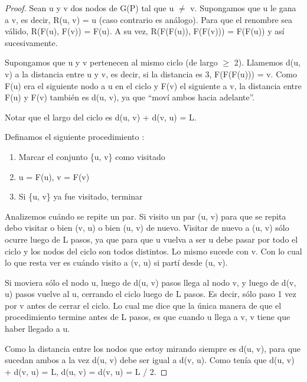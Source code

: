 \begin{proof}
	Sean u y v dos nodos de G(P) tal que u $\neq$ v. Supongamos que u le gana a v, es decir, R(u, v) = u (caso contrario es análogo). Para que el renombre sea válido, R(F(u), F(v)) = F(u). A su vez, R(F(F(u)), F(F(v))) = F(F(u)) y así sucesivamente. \newline

	Supongamos que u y v pertenecen al mismo ciclo (de largo $\geq$ 2). Llamemos d(u, v) a la distancia entre u y v, es decir, si la distancia es 3, F(F(F(u))) = v. Como F(u) era el siguiente nodo a u en el ciclo y F(v) el siguiente a v, la distancia entre F(u) y F(v) también es d(u, v), ya que ``moví ambos hacia adelante''. \newline

	Notar que el largo del ciclo es d(u, v) + d(v, u) = L.

	Definamos el siguiente procedimiento : \newline

	\begin{enumerate}
		\item{Marcar el conjunto \{u, v\} como visitado}
		\item{u = F(u), v = F(v)}
		\item{Si \{u, v\} ya fue visitado, terminar}
	\end{enumerate}

	Analizemos cuándo se repite un par. Si visito un par (u, v) para que se repita debo visitar o bien (v, u) o bien (u, v) de nuevo. Visitar de nuevo a (u, v) sólo ocurre luego de L pasos, ya que para que u vuelva a ser u debe pasar por todo el ciclo y los nodos del ciclo son todos distintos. Lo mismo sucede con v. Con lo cual lo que resta ver es cuándo visito a (v, u) si partí desde (u, v). \newline

	Si moviera sólo el nodo u, luego de d(u, v) pasos llega al nodo v, y luego de d(v, u) pasos vuelve al u, cerrando el ciclo luego de L pasos. Es decir, sólo paso 1 vez por v antes de cerrar el ciclo. Lo cual me dice que la única manera de que el procedimiento termine antes de L pasos, es que cuando u llega a v, v tiene que haber llegado a u. \newline

	Como la distancia entre los nodos que estoy mirando siempre es d(u, v), para que sucedan ambos a la vez d(u, v) debe ser igual a d(v, u). Como tenía que d(u, v) + d(v, u) = L, d(u, v) = d(v, u) = L / 2. \newline


\end{proof}
